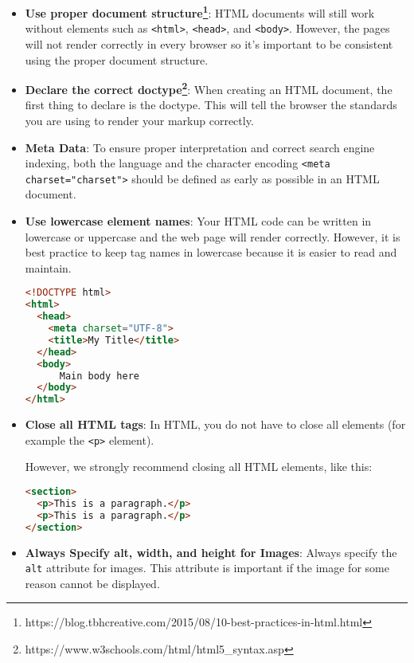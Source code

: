 \documentclass[11pt,a4paper]{report}
\newcommand{\bfb}[1]{{\bf \color{blue} #1}}
\begin{document}
\begin{itemize}
\item \bfb{Use proper document structure\footnote{https://blog.tbhcreative.com/2015/08/10-best-practices-in-html.html}}: HTML documents will still work without elements such as \verb|<html>|, \verb|<head>|, and \verb|<body>|. However, the pages will not render correctly in every browser so it's important to be consistent using the proper document structure. 

\item \bfb{Declare the correct doctype\footnote{https://www.w3schools.com/html/html5\_syntax.asp}}: When creating an HTML document, the first thing to declare is the doctype. This will tell the browser the standards you are using to render your markup correctly. 

\item \bfb{Meta Data}: To ensure proper interpretation and correct search engine indexing, both the language and the character encoding \verb|<meta charset="charset">| should be defined as early as possible in an HTML document.

\item \bfb{Use lowercase element names}: Your HTML code can be written in lowercase or uppercase and the web page will render correctly. However, it is best practice to keep tag names in lowercase because it is easier to read and maintain.

\begin{lstlisting}[language=html]
<!DOCTYPE html>
<html>
  <head>
    <meta charset="UTF-8">
    <title>My Title</title>
  </head>
  <body>
      Main body here
  </body>
</html>
\end{lstlisting}

\item \bfb{Close all HTML tags}: In HTML, you do not have to close all elements (for example the \verb|<p>| element).

However, we strongly recommend closing all HTML elements, like this:
\begin{lstlisting}[language=html]
<section>
  <p>This is a paragraph.</p>
  <p>This is a paragraph.</p>
</section>
\end{lstlisting}



\item \bfb{Always Specify alt, width, and height for Images}: Always specify the \verb|alt| attribute for images. This attribute is important if the image for some reason cannot be displayed.


\end{itemize}
\end{document}

